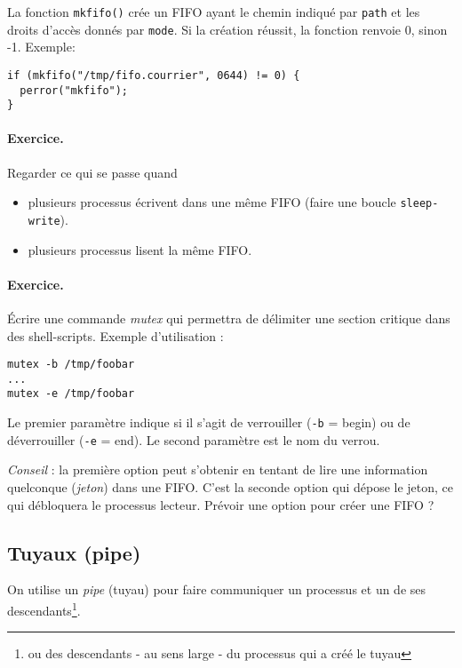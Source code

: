 La fonction \texttt{mkfifo()} crée un FIFO ayant le chemin indiqué par
\texttt{path} et les droits d'accès donnés par \texttt{mode}. Si la
création réussit, la fonction renvoie 0, sinon -1. Exemple:

\extrait
\begin{lstlisting}
if (mkfifo("/tmp/fifo.courrier", 0644) != 0) {
  perror("mkfifo");
}
\end{lstlisting}


\paragraph*{Exercice.} Regarder ce qui se passe quand
\begin{itemize}
\item plusieurs processus écrivent dans une même FIFO (faire une boucle
\texttt{sleep-write}).
\item plusieurs processus lisent la même FIFO.
\end{itemize}

\paragraph*{Exercice. } Écrire une commande \emph{mutex} qui permettra de 
délimiter une section critique dans des shell-scripts. Exemple
d'utilisation :

\extrait
\begin{lstlisting}
mutex -b /tmp/foobar
...
mutex -e /tmp/foobar
\end{lstlisting}

Le premier paramètre indique si il s'agit de verrouiller (\texttt{-b}
= begin) ou de déverrouiller (\texttt{-e} = end). Le second paramètre
est le nom du verrou.

\emph{Conseil} : la première option peut s'obtenir en tentant de lire
une information quelconque (\emph{jeton}) dans une FIFO. C'est la
seconde option qui dépose le jeton, ce qui débloquera le processus
lecteur.  Prévoir une option pour créer une FIFO ?


\subsection{Tuyaux (pipe)}

On utilise un \emph{pipe} (tuyau) pour faire communiquer un processus
et un de ses descendants\footnote{ou des descendants - au sens large -
du processus qui a créé le tuyau}.


